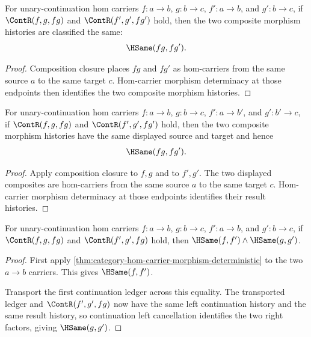 \begin{theorem}
\label{thm:category-hom-carrier-composite-result-congruence}
For unary-continuation hom carriers $f:a\to b$, $g:b\to c$,
$f':a\to b$, and $g':b\to c$, if $\ContR(f,g,fg)$ and
$\ContR(f',g',fg')$ hold, then the two composite morphism histories are
classified the same:
$$
\HSame(fg,fg').
$$
\end{theorem}
\begin{proof}
Composition closure places $fg$ and $fg'$ as hom-carriers from the same source
$a$ to the same target $c$. Hom-carrier morphism determinacy at those
endpoints then identifies the two composite morphism histories.
\end{proof}

\begin{theorem}
\label{thm:category-hom-carrier-comp-same-endpoints-result-deterministic}
For unary-continuation hom carriers $f:a\to b$, $g:b\to c$,
$f':a\to b'$, and $g':b'\to c$, if $\ContR(f,g,fg)$ and
$\ContR(f',g',fg')$ hold, then the two composite morphism histories have the
same displayed source and target and hence
$$
\HSame(fg,fg').
$$
\end{theorem}
\begin{proof}
Apply composition closure to $f,g$ and to $f',g'$. The two displayed
composites are hom-carriers from the same source $a$ to the same target $c$.
Hom-carrier morphism determinacy at those endpoints identifies their result
histories.
\end{proof}

\begin{theorem}
\label{thm:category-hom-carrier-comp-same-middle-factors-deterministic}
For unary-continuation hom carriers $f:a\to b$, $g:b\to c$,
$f':a\to b$, and $g':b\to c$, if $\ContR(f,g,fg)$ and
$\ContR(f',g',fg)$ hold, then
$\HSame(f,f')\land\HSame(g,g')$.
\end{theorem}
\begin{proof}
First apply
\autoref{thm:category-hom-carrier-morphism-deterministic} to the two
$a\to b$ carriers. This gives $\HSame(f,f')$.

Transport the first continuation ledger across this equality. The transported
ledger and $\ContR(f',g',fg)$ now have the same left continuation history and
the same result history, so continuation left cancellation identifies the two
right factors, giving $\HSame(g,g')$.
\end{proof}

